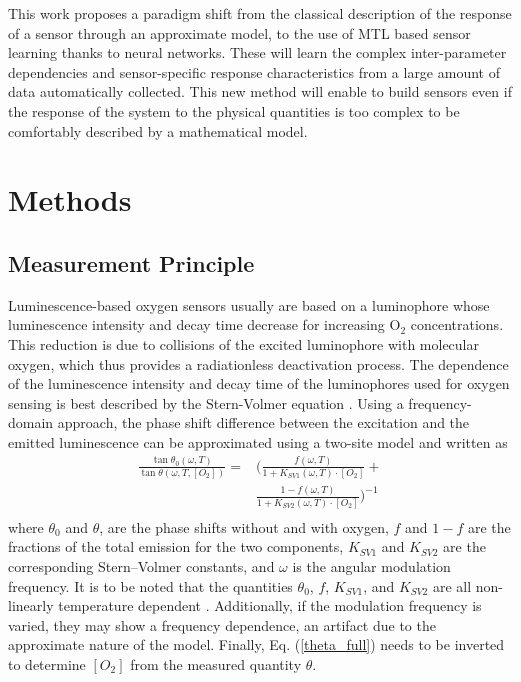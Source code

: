 \documentclass[sensors,article,submit,moreauthors,pdftex,10pt,a4paper]{Definitions/mdpi}
\begin{document}
This work proposes a paradigm shift from the classical description of the response of a sensor through an approximate model, to the use of MTL based sensor learning thanks to neural networks. 
These will learn the complex inter-parameter dependencies and sensor-specific response characteristics from a large amount of data automatically collected. This new method will enable to build sensors even if the response of the system to the physical quantities is too complex to be comfortably described by a mathematical model.


\section{Methods}
\label{sec:methods}

\subsection{Measurement Principle}
\label{Theory}

Luminescence-based oxygen sensors usually are based on a luminophore whose luminescence intensity and decay time decrease for increasing O$_2$ concentrations. This reduction is due to collisions of the excited luminophore with molecular oxygen, which thus provides a radiationless deactivation process. The dependence of the luminescence intensity and decay time of the luminophores used for oxygen sensing is best described by the Stern-Volmer equation \cite{Lakowicz2006}. Using a frequency-domain approach, the phase shift difference between the excitation and the emitted luminescence can be approximated using a two-site model \cite{Carraway1991,Demas1995} and written as \cite{Michelucci2019}
\begin{equation}
\begin{aligned}
\frac{\tan \theta_0 (\omega, T)}{\tan \theta (\omega, T, [O_2])}=
 & \bigg( \frac{f (\omega , T) }{1+K_{SV1} (\omega , T) \cdot \left[O_2\right]}+ \\
&\frac{1-f (\omega , T) }{1+K_{SV2} (\omega , T) \cdot \left[O_2\right]} \bigg)^{-1} \\
\label{theta_full}
\end{aligned}
\end{equation}
where $\theta_0$ and $\theta$, are the phase shifts without and with oxygen, $f$ and $1-f$ are the fractions of the total emission for the two components, $K_{SV1}$ and $K_{SV2}$ are the corresponding Stern–Volmer constants, and $\omega$ is the angular modulation frequency. It is to be noted that the quantities $\theta_0$, $f$, $K_{SV1}$, and $K_{SV2}$ are all non-linearly temperature dependent \cite{Ogurtsov2006,lo2008,Zaitsev2016}. Additionally, if the modulation frequency is varied, they may show a frequency dependence, an artifact due to the approximate nature of the model. Finally, Eq. (\ref{theta_full}) needs to be inverted to determine $[O_2]$ from the measured quantity $\theta$.
\end{document}
